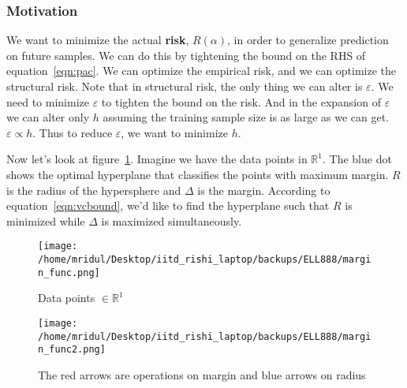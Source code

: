 \documentclass[11pt]{article}
\begin{document}
\subsubsection{Motivation}
We want to minimize the actual {\bf risk}, $R(\alpha)$, in order to generalize
prediction on future samples. We can do this by tightening the bound on the RHS
of equation~\ref{eqn:pac}. We can optimize the empirical risk, and we can
optimize the structural risk. Note that in structural risk, the only thing we
can alter is $\varepsilon$. We need to minimize $\varepsilon$ to tighten the
bound on the risk. And in the expansion of $\varepsilon$ we can alter only $h$
assuming the training sample size is as large as we can get.
$\varepsilon\propto h$. Thus to reduce $\varepsilon$, we want to minimize
$h$.\par
Now let's look at figure~\ref{fig:1}. Imagine we have the data points in
$\mathbb{R}^1$. The blue dot shows the optimal hyperplane that classifies the
points with maximum margin. $R$ is the radius of the hypersphere and $\Delta$ is
the margin. According to equation~\ref{eqn:vcbound}, we'd like to find the
hyperplane such that $R$ is minimized while $\Delta$ is maximized
simultaneously.
\begin{figure}[!htbp]
    \centering
    \texttt{[image: /home/mridul/Desktop/iitd\_rishi\_laptop/backups/ELL888/margin\_func.png]}
    \caption{\label{fig:1}Data points $\in\mathbb{R}^1$}
\end{figure}
\begin{figure}[!htbp]
    \centering
    \texttt{[image: /home/mridul/Desktop/iitd\_rishi\_laptop/backups/ELL888/margin\_func2.png]}
    \caption{\label{fig:2}The red arrows are operations on margin and blue
    arrows on radius}
\end{figure}
\end{document}

